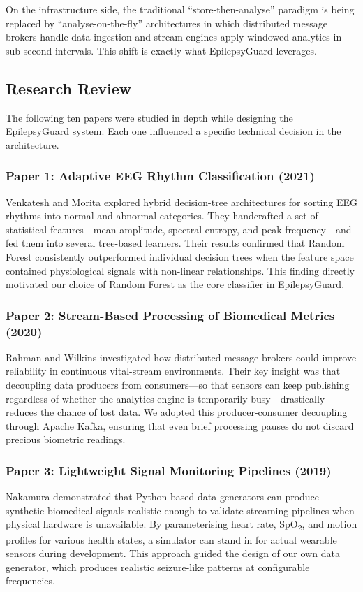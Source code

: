 \documentclass[12pt, a4paper, oneside]{report}
\begin{document}
On the infrastructure side, the traditional ``store-then-analyse'' paradigm is being replaced by ``analyse-on-the-fly'' architectures in which distributed message brokers handle data ingestion and stream engines apply windowed analytics in sub-second intervals. This shift is exactly what EpilepsyGuard leverages.

\subsection{Research Review}
The following ten papers were studied in depth while designing the EpilepsyGuard system. Each one influenced a specific technical decision in the architecture.

\subsubsection{Paper 1: Adaptive EEG Rhythm Classification (2021)}
Venkatesh and Morita \cite{ref1} explored hybrid decision-tree architectures for sorting EEG rhythms into normal and abnormal categories. They handcrafted a set of statistical features---mean amplitude, spectral entropy, and peak frequency---and fed them into several tree-based learners. Their results confirmed that Random Forest consistently outperformed individual decision trees when the feature space contained physiological signals with non-linear relationships. This finding directly motivated our choice of Random Forest as the core classifier in EpilepsyGuard.

\subsubsection{Paper 2: Stream-Based Processing of Biomedical Metrics (2020)}
Rahman and Wilkins \cite{ref2} investigated how distributed message brokers could improve reliability in continuous vital-stream environments. Their key insight was that decoupling data producers from consumers---so that sensors can keep publishing regardless of whether the analytics engine is temporarily busy---drastically reduces the chance of lost data. We adopted this producer-consumer decoupling through Apache Kafka, ensuring that even brief processing pauses do not discard precious biometric readings.

\subsubsection{Paper 3: Lightweight Signal Monitoring Pipelines (2019)}
Nakamura \cite{ref3} demonstrated that Python-based data generators can produce synthetic biomedical signals realistic enough to validate streaming pipelines when physical hardware is unavailable. By parameterising heart rate, SpO\textsubscript{2}, and motion profiles for various health states, a simulator can stand in for actual wearable sensors during development. This approach guided the design of our own data generator, which produces realistic seizure-like patterns at configurable frequencies.
\end{document}
